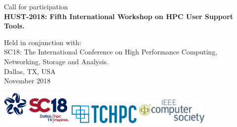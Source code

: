 \documentclass[11pt,a4paper]{article}
\begin{document}
\begin{titlepage}
\begin{center}
\vspace{40mm}
{ {\selectfont \Huge Call for participation}}\\
\vspace{4mm}
{\bf {\selectfont \huge HUST-2018:  Fifth International Workshop on HPC User Support Tools.}}\\
\vspace{20mm}

{ {\selectfont \huge Held in conjunction with: }}\\
\vspace{2mm}
{ {\selectfont \huge SC18: The International Conference on High
Performance Computing, Networking, Storage and Analysis.}}\\
\vspace{80mm}
{ {\selectfont \Huge Dallas, TX, USA}}\\
\vspace{2mm}
{ {\selectfont \Huge  November 2018}}\\
\vspace{35mm}

\includegraphics[width=35mm]{../img/SC18-color-hor.jpg}
\hspace{15mm}
\includegraphics[width=35mm]{../img/tchpc_logo_cmyk.png}
\hspace{15mm}
\includegraphics[width=35mm]{../img/IEEE-eps/ComputerSocietyLogo-RGB-stacked.png}
\\

\end{center}
\end{titlepage}

\lhead{}
\rhead{}
\pagestyle{fancy}

\setcounter{page}{2}
\end{document}
